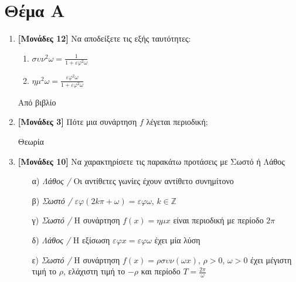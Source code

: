 \documentclass[12pt]{article}
\begin{document}
\section*{Θέμα Α}
\noindent
\begin{enumerate}
 \item \textbf{[Μονάδες 12]} Να αποδείξετε τις εξής ταυτότητες:

       \begin{multicols}{2}
        \begin{enumerate}[label=(\roman*).]
         \item $συν^2ω=\frac{1}{1+εφ^2ω}$
         \item $ημ^2ω=\frac{εφ^2ω}{1+εφ^2ω}$
        \end{enumerate}
       \end{multicols}

       Από βιβλίο

 \item \textbf{[Μονάδες 3]} Πότε μια συνάρτηση $f$ λέγεται περιοδική;

       Θεωρία

 \item \textbf{[Μονάδες 10]} Να χαρακτηρίσετε τις παρακάτω προτάσεις με Σωστό ή Λάθος
       \begin{enumerate}
        \item [α)] \emph{Λάθος / } Οι αντίθετες γωνίες έχουν αντίθετο συνημίτονο
        \item [β)] \emph{Σωστό / } $εφ(2kπ+ω)=εφω$, $k\in\mathbb{Z}$
        \item [γ)] \emph{Σωστό / } Η συνάρτηση $f(x)=ημx$ είναι περιοδική με περίοδο $2π$
        \item [δ)] \emph{Λάθος / } Η εξίσωση $εφx=εφω$ έχει μία λύση
        \item [ε)] \emph{Σωστό / } Η συνάρτηση $f(x)=ρσυν(ωx)$, $ρ>0$, $ω>0$ έχει μέγιστη τιμή το $ρ$, ελάχιστη τιμή το $-ρ$ και περίοδο $Τ=\frac{2π}{ω}$
       \end{enumerate}
\end{enumerate}
\end{document}
